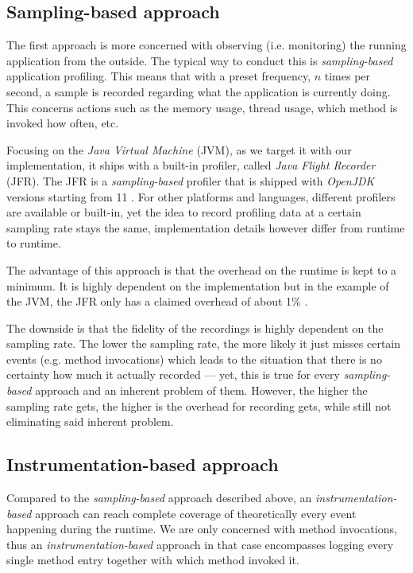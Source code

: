 \documentclass[12pt,a4paper]{report}
\begin{document}
\subsection{Sampling\hyp based approach}

The first approach is more concerned with observing (i.e. monitoring)
the running application from the outside. The typical way to conduct this is
\textit{sampling\hyp based} application profiling. This means that with a preset
frequency, \(n\) times per second, a sample is recorded regarding what the
application is currently doing. This concerns actions such as
the memory usage, thread usage, which method is invoked how often, etc.

Focusing on the \textit{Java Virtual Machine} (JVM), as we target it with our
implementation, it ships with a built-in profiler,
called \textit{Java Flight Recorder} (JFR).
The JFR is a \textit{sampling\hyp based} profiler that is shipped
with \textit{OpenJDK} versions starting from 11 \cite{openjdk-jfr}.
For other platforms and languages, different profilers are available or built-in,
yet the idea to record profiling data at a certain sampling rate
stays the same, implementation details however differ from runtime to runtime.

The advantage of this approach is that the overhead on the runtime is kept to
a minimum. It is highly dependent on the implementation but in the example of
the JVM, the JFR only has a claimed overhead of about 1\% \cite{openjdk-jfr}.

The downside is that the fidelity of the recordings is highly dependent on the
sampling rate. The lower the sampling rate, the more likely it just misses
certain events (e.g. method invocations) which leads to the situation that
there is no certainty how much it actually recorded --- yet, this is true
for every \textit{sampling\hyp based} approach and an inherent problem of them.
However, the higher the sampling rate gets, the higher is the overhead for
recording gets, while still not eliminating said inherent problem.


\subsection{Instrumentation\hyp based approach}

Compared to the \textit{sampling\hyp based} approach described above,
an \textit{instrumentation\hyp based} approach can reach complete coverage of
theoretically every event happening during the runtime.
We are only concerned with method invocations, thus an
\textit{instrumentation\hyp based} approach in that case encompasses logging
every single method entry together with which method invoked it.
\end{document}
